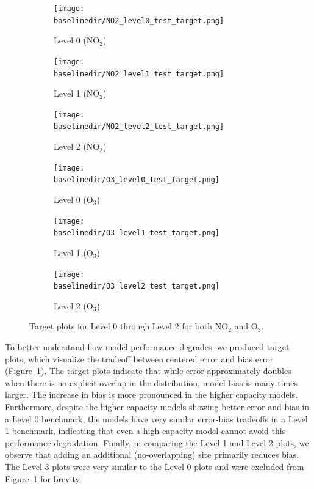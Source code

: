 \documentclass[journal abbreviation, manuscript]{copernicus}
\newcommand{\textus}[1]{$_{\text{#1}}$}
\begin{document}
\begin{figure}[t]
\centering
\begin{subfigure}{0.33\textwidth}
\texttt{[image: \\baselinedir/NO2\_level0\_test\_target.png]}
\caption{Level 0 (NO\textus{2})}
\end{subfigure}
\begin{subfigure}{0.33\textwidth}
\texttt{[image: \\baselinedir/NO2\_level1\_test\_target.png]}
\caption{Level 1 (NO\textus{2})}
\end{subfigure}
\begin{subfigure}{0.33\textwidth}
\texttt{[image: \\baselinedir/NO2\_level2\_test\_target.png]}
\caption{Level 2 (NO\textus{2})}
\end{subfigure}
\begin{subfigure}{0.33\textwidth}
\texttt{[image: \\baselinedir/O3\_level0\_test\_target.png]}
\caption{Level 0 (O\textus{3})}
\end{subfigure}
\begin{subfigure}{0.33\textwidth}
\texttt{[image: \\baselinedir/O3\_level1\_test\_target.png]}
\caption{Level 1 (O\textus{3})}
\end{subfigure}
\begin{subfigure}{0.33\textwidth}
\texttt{[image: \\baselinedir/O3\_level2\_test\_target.png]}
\caption{Level 2 (O\textus{3})}
\end{subfigure}
\caption{Target plots for Level 0 through Level 2 for both NO\textus{2} and O\textus{3}.}
\label{fig:target-plots-levels}
\end{figure}

To better understand how model performance degrades, we produced target plots, which visualize the tradeoff between centered error and bias  error (Figure~\ref{fig:target-plots-levels}).  The target plots indicate that while error approximately doubles when there is no explicit overlap in the distribution, model bias is many times larger. The increase in bias is more pronounced in the higher capacity models. Furthermore, despite the higher capacity models showing better error and bias in a Level 0 benchmark, the models have very similar error-bias tradeoffs in a Level 1 benchmark, indicating that even a high-capacity model cannot avoid this performance degradation.  Finally, in comparing the Level 1 and Level 2 plots, we observe that adding an additional (no-overlapping) site primarily reduces bias.  The Level 3 plots were very similar to the Level 0 plots and were excluded from Figure~\ref{fig:target-plots-levels} for brevity.
\end{document}
